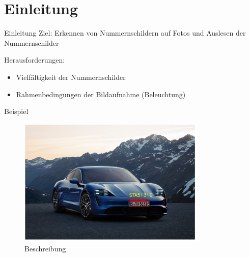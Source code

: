\section{Einleitung}

\begin{frame}{Einleitung}
    Ziel: Erkennen von Nummernschildern auf Fotos und Auslesen der Nummernschilder
    
    Herausforderungen:
    \begin{itemize}
        \item Vielfältigkeit der Nummernschilder
        \item Rahmenbedingungen der Bildaufnahme (Beleuchtung)
    \end{itemize}
\end{frame}

\begin{frame}{Beispiel}
  \begin{figure}
    \begin{center}
      \includegraphics[width=0.8\textwidth]{bilder/Bild2}
      \caption{Beschreibung}
    \end{center}
  \end{figure}
  \end{frame}
